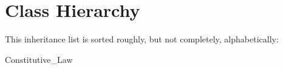 \section{Class Hierarchy}
This inheritance list is sorted roughly, but not completely, alphabetically\+:\begin{DoxyCompactList}
\item Constitutive\+\_\+\+Law\begin{DoxyCompactList}
\item {}
\end{DoxyCompactList}
\end{DoxyCompactList}
